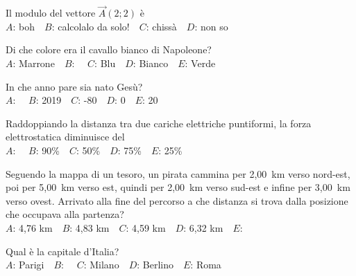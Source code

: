 \mcquestionfooter



\def\mcquestionnumber{6}


\mcquestionheader Il modulo del vettore $\vec{A}(2;2)$ è\\
{$A$}: boh\ \ {$B$}: calcolalo da solo!\ \ {$C$}: chissà\ \ {$D$}: non so\ \ 

\mcquestionfooter



\def\mcquestionnumber{7}


\mcquestionheader Di che colore era il cavallo bianco di Napoleone?\\
{$A$}: Marrone\ \ {$B$}: \ \ {$C$}: Blu\ \ {$D$}: Bianco\ \ {$E$}: Verde\ \ 

\mcquestionfooter



\def\mcquestionnumber{8}


\mcquestionheader In che anno pare sia nato Gesù?\\
{$A$}: \ \ {$B$}: 2019\ \ {$C$}: -80\ \ {$D$}: 0\ \ {$E$}: 20\ \ 

\mcquestionfooter



\def\mcquestionnumber{9}


\mcquestionheader Raddoppiando la distanza tra due cariche elettriche puntiformi, la forza elettrostatica diminuisce del\\
{$A$}: \ \ {$B$}: 90\%\ \ {$C$}: 50\%\ \ {$D$}: 75\%\ \ {$E$}: 25\%\ \ 

\mcquestionfooter



\def\mcquestionnumber{10}


\mcquestionheader Seguendo la mappa di un tesoro, un pirata cammina per 2,00~km verso nord-est, poi per 5,00~km verso est, quindi per 2,00~km verso sud-est e infine per 3,00~km verso ovest. Arrivato alla fine del percorso a che distanza si trova dalla posizione che occupava alla partenza?\\
{$A$}: 4,76 km\ \ {$B$}: 4,83 km\ \ {$C$}: 4,59 km\ \ {$D$}: 6,32 km\ \ {$E$}: \ \ 

\mcquestionfooter



\def\mcquestionnumber{11}


\mcquestionheader Qual è la capitale d’Italia?\\
{$A$}: Parigi\ \ {$B$}: \ \ {$C$}: Milano\ \ {$D$}: Berlino\ \ {$E$}: Roma\ \ 

\mcquestionfooter



